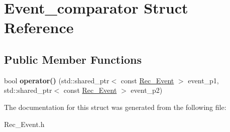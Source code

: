\hypertarget{structEvent__comparator}{}\section{Event\+\_\+comparator Struct Reference}
\label{structEvent__comparator}
\subsection*{Public Member Functions}
\begin{DoxyCompactItemize}
\item 
\mbox{\label{structEvent__comparator_a0dbf57478071548eda1b94b36971186b}} 
bool {\bfseries operator()} (std\+::shared\+\_\+ptr$<$ const \hyperlink{classRec__Event}{Rec\+\_\+\+Event} $>$ event\+\_\+p1, std\+::shared\+\_\+ptr$<$ const \hyperlink{classRec__Event}{Rec\+\_\+\+Event} $>$ event\+\_\+p2)
\end{DoxyCompactItemize}


The documentation for this struct was generated from the following file\+:\begin{DoxyCompactItemize}
\item 
Rec\+\_\+\+Event.\+h\end{DoxyCompactItemize}
